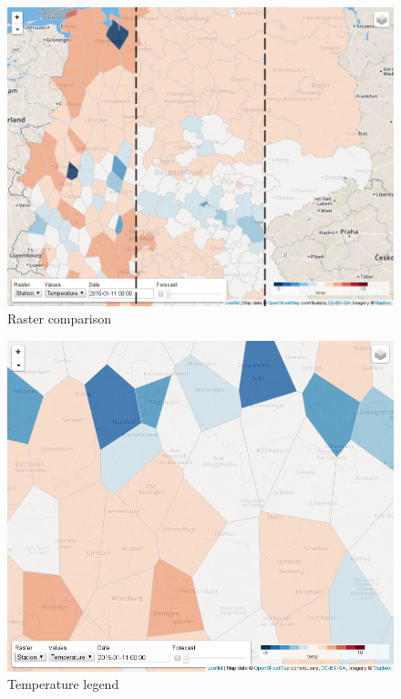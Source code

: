 \documentclass[paper=a4, fontsize=11pt]{article} %
\numberwithin{equation}{section} %
\numberwithin{figure}{section} %
\numberwithin{table}{section} %
\begin{document}
\begin{figure}[htbp]
\centering
\includegraphics[width=1\textwidth]{pictures/screenshot-raster.png}
\caption{Raster comparison}
\label{fig:raster-comparison}
\end{figure}

\begin{figure}[htbp]
\centering
\includegraphics[width=1\textwidth]{pictures/screenshot-legend-temp.png}
\caption{Temperature legend}
\label{fig:temperature-legend}
\end{figure}
\end{document}
